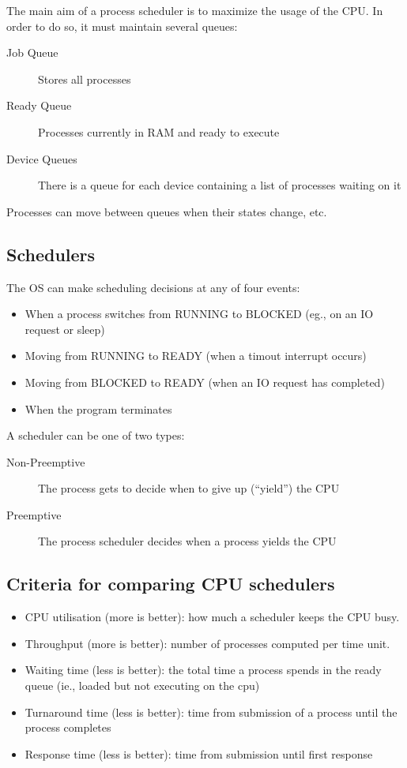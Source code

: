 The main aim of a process scheduler is to maximize the usage of the CPU.
In order to do so, it must maintain several queues:
\begin{description}
	\item[Job Queue] Stores all processes
	\item[Ready Queue] Processes currently in RAM and ready to execute
	\item[Device Queues] There is a queue for each device containing a list of processes waiting on it
\end{description}

\begin{note}
	Processes can move between queues when their states change, etc.
\end{note}

\subsection{Schedulers}\label{sub:schedulers}

The OS can make scheduling decisions at any of four events:
\begin{itemize}
	\item When a process switches from RUNNING to BLOCKED (eg., on an IO request or sleep)
	\item Moving from RUNNING to READY (when a timout interrupt occurs)
	\item Moving from BLOCKED to READY (when an IO request has completed)
	\item When the program terminates
\end{itemize}
A scheduler can be one of two types:
\begin{description}
	\item[Non-Preemptive] The process gets to decide when to give up (``yield'') the CPU
	\item[Preemptive] The process scheduler decides when a process yields the CPU
\end{description}

\subsection{Criteria for comparing CPU schedulers}\label{sub:criteria_for_comparing_cpu_shcedulers}

\begin{itemize}
	\item CPU utilisation (more is better): how much a scheduler keeps the CPU busy.
	\item Throughput (more is better): number of processes computed per time unit.
	\item Waiting time (less is better): the total time a process spends in the ready queue (ie., loaded but not executing on the cpu)
	\item Turnaround time (less is better): time from submission of a process until the process completes
	\item Response time (less is better): time from submission until first response
\end{itemize}

